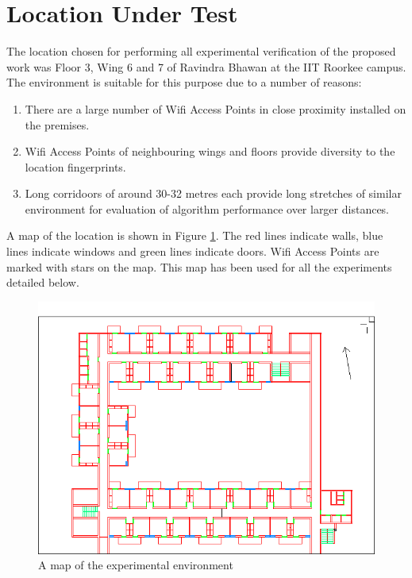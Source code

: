 \section{Location Under Test}

The location chosen for performing all experimental verification of the
proposed work was Floor 3, Wing 6 and 7 of Ravindra Bhawan at the IIT Roorkee
campus. The environment is suitable for this purpose due to a number of reasons:

\begin{enumerate}
\item There are a large number of Wifi Access Points in close proximity 
    installed on the premises.
\item Wifi Access Points of neighbouring wings and floors provide diversity
    to the location fingerprints.
\item Long corridoors of around 30-32 metres each provide long stretches of
    similar environment for evaluation of algorithm performance over larger
    distances.
\end{enumerate}

A map of the location is shown in Figure \ref{fig:ravindra_map}. The red lines
indicate walls, blue lines indicate windows and green lines indicate doors.
Wifi Access Points are marked with stars on the map. This map has been used
for all the experiments detailed below.

\begin{figure}
    \centering
    \includegraphics[width=6in]{figures/ravindra_map.png}
    \caption{A map of the experimental environment\label{fig:ravindra_map}}
\end{figure}



